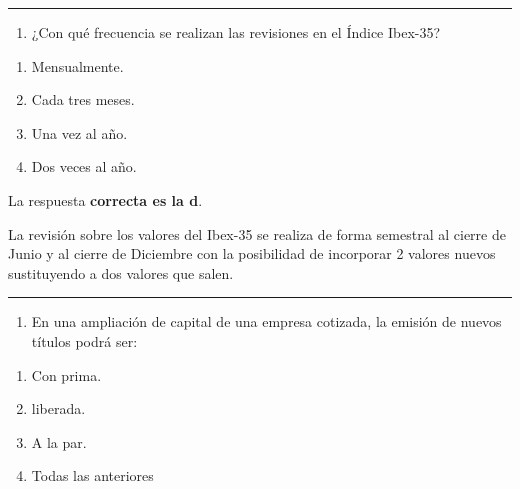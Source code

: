 \documentclass[
  letterpaper,
  DIV=11,
  numbers=noendperiod]{scrreprt}
\providecommand{\tightlist}{%
  \setlength{\itemsep}{0pt}\setlength{\parskip}{0pt}}\usepackage{longtable,booktabs,array}
\begin{document}
\begin{center}\rule{0.5\linewidth}{0.5pt}\end{center}

\begin{enumerate}
\def\labelenumi{\arabic{enumi}.}
\setcounter{enumi}{46}
\tightlist
\item
  ¿Con qué frecuencia se realizan las revisiones en el Índice Ibex-35?
\end{enumerate}

\begin{enumerate}
\def\labelenumi{\alph{enumi})}
\item
  Mensualmente.
\item
  Cada tres meses.
\item
  Una vez al año.
\item
  Dos veces al año.
\end{enumerate}

\begin{tcolorbox}[enhanced jigsaw, left=2mm, opacityback=0, colback=white, breakable, arc=.35mm, bottomrule=.15mm, rightrule=.15mm, toprule=.15mm, leftrule=.75mm, colframe=quarto-callout-tip-color-frame]
\begin{minipage}[t]{5.5mm}
\textcolor{quarto-callout-tip-color}{\faLightbulb}
\end{minipage}%
\begin{minipage}[t]{\textwidth - 5.5mm}

La respuesta \textbf{correcta es la d}.

La revisión sobre los valores del Ibex-35 se realiza de forma semestral
al cierre de Junio y al cierre de Diciembre con la posibilidad de
incorporar 2 valores nuevos sustituyendo a dos valores que salen.

\end{minipage}%
\end{tcolorbox}

\begin{center}\rule{0.5\linewidth}{0.5pt}\end{center}

\begin{enumerate}
\def\labelenumi{\arabic{enumi}.}
\setcounter{enumi}{47}
\tightlist
\item
  En una ampliación de capital de una empresa cotizada, la emisión de
  nuevos títulos podrá ser:
\end{enumerate}

\begin{enumerate}
\def\labelenumi{\alph{enumi})}
\item
  Con prima.
\item
  liberada.
\item
  A la par.
\item
  Todas las anteriores
\end{enumerate}
\end{document}
